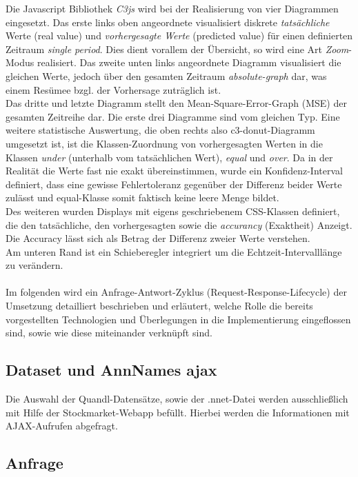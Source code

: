 Die Javascript Bibliothek \emph{C3js} wird bei der Realisierung von vier Diagrammen eingesetzt. Das erste links oben angeordnete visualisiert diskrete \emph{tatsächliche} Werte (real value) und \emph{vorhergesagte Werte} (predicted value) für einen definierten Zeitraum \emph{single period}. Dies dient vorallem der Übersicht, so wird eine Art \emph{Zoom}-Modus realisiert. Das zweite unten links angeordnete Diagramm visualisiert die gleichen Werte, jedoch über den gesamten Zeitraum \emph{absolute-graph} dar, was einem Resümee bzgl. der Vorhersage zuträglich ist.\\
Das dritte und letzte Diagramm stellt den Mean-Square-Error-Graph (MSE) der gesamten Zeitreihe dar. Die erste drei Diagramme sind vom gleichen Typ. 
Eine weitere statistische Auswertung, die oben rechts also c3-donut-Diagramm umgesetzt ist, ist die Klassen-Zuordnung von vorhergesagten Werten in die Klassen \emph{under} (unterhalb vom tatsächlichen Wert), \emph{equal} und \emph{over}. Da in der Realität die Werte fast nie exakt übereinstimmen, wurde ein Konfidenz-Interval definiert, dass eine gewisse Fehlertoleranz gegenüber der Differenz beider Werte zulässt und equal-Klasse somit faktisch keine leere Menge bildet. \\
Des weiteren wurden Displays mit eigens geschriebenem CSS-Klassen definiert, die den tatsächliche, den vorhergesagten sowie die \emph{accurancy} (Exaktheit) Anzeigt. Die Accuracy lässt sich als Betrag der Differenz zweier Werte verstehen. \\
Am unteren Rand ist ein Schieberegler integriert um die Echtzeit-Intervalllänge zu verändern.\\\\


Im folgenden wird ein Anfrage-Antwort-Zyklus (Request-Response-Lifecycle) der Umsetzung detailliert beschrieben und erläutert, welche Rolle die bereits vorgestellten Technologien und Überlegungen in die Implementierung eingeflossen sind, sowie wie diese miteinander verknüpft sind.      

\subsection{Dataset und AnnNames ajax}
Die Auswahl der Quandl-Datensätze, sowie der .nnet-Datei werden ausschließlich mit Hilfe der Stockmarket-Webapp befüllt. Hierbei werden die Informationen mit AJAX-Aufrufen abgefragt. 

\subsection{Anfrage}
